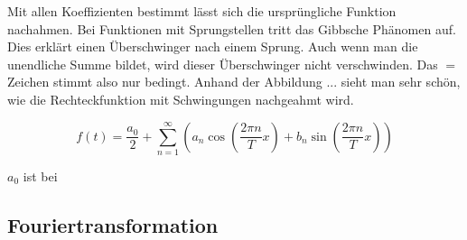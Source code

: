 Mit allen Koeffizienten bestimmt lässt sich die ursprüngliche Funktion nachahmen.
Bei Funktionen mit Sprungstellen tritt das Gibbsche Phänomen auf.
Dies erklärt einen Überschwinger nach einem Sprung. Auch wenn man die unendliche Summe bildet, wird dieser Überschwinger nicht verschwinden.
Das $=$ Zeichen stimmt also nur bedingt.
Anhand der Abbildung ... sieht man sehr schön, wie die Rechteckfunktion mit Schwingungen nachgeahmt wird.

\[
f(t) = \frac{a_0}{2} + \sum_{n=1}^{\infty} \left( a_n \cos\left( \frac{2\pi n}{T} x \right) + b_n \sin\left( \frac{2\pi n}{T} x \right) \right)
\]


$a_0$ ist bei 




\subsection{Fouriertransformation\label{fourier:subsection:fouriertransformation}}

